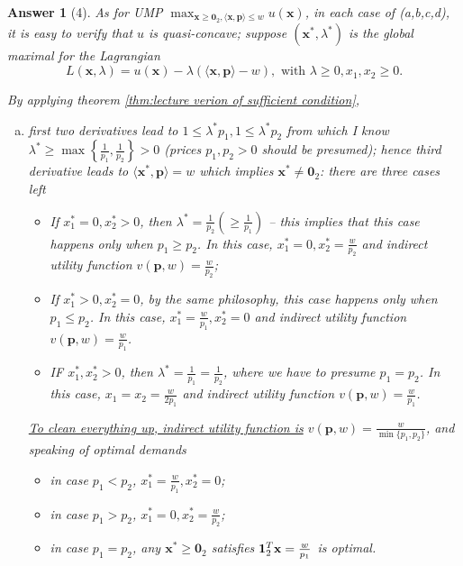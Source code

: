 \documentclass{article}
\newtheorem*{ans}{Answer}
\newcommand{\1}{{\bf 1}}
\newcommand{\0}{{\mathbf{0}}}
\newcommand{\p}{{\mathbf{p}}}
\newcommand{\x}{{\mathbf{x}}}
\newcommand{\<}{\langle}
\renewcommand{\>}{\rangle}
\newcommand{\dps}{\displaystyle}
\begin{document}
\begin{ans}[4]  As for UMP $\dps \max_{\x \ge \0_2, \langle \x,\p\rangle \le w } u(\x)$, in each case of (a,b,c,d), it is easy to verify that $u$ is quasi-concave; suppose $(\x^*,\lambda^*)$ is the global maximal for the Lagrangian 
	$$L(\x,\lambda) = u(\x)  - 	 \lambda(  \langle \x , \p 	\rangle - w ), \text{ with }\lambda \ge 0, x_1,x_2 \ge 0.$$ 
	
	By applying theorem \ref{thm:lecture verion of sufficient condition},
	\begin{enumerate}[(a)]
		\item  first two derivatives lead to $1 \le \lambda^* p_1, 1 \le \lambda^* p_2$ from which I know $\lambda^* \ge \max\left\{ \frac1{p_1},  \frac1{p_2} \right\} >0$ (prices $p_1,p_2 >0$ should be presumed); hence third derivative leads to $\langle \x^* , \p 	\rangle = w  $ which implies $\x^* \ne \0_2$: there are three cases left
		\begin{itemize}
			\item If $x_1^* =0, x_2^* >0$, then $ \lambda^*  = \frac1{p_2} \left(\ge \frac1{p_1}\right)$ -- this implies that this case happens only when $p_1 \ge p_2$. In this case, $x_1^* = 0,x_2^* = \frac{w}{p_2}$ and indirect utility function $v(\p,w) = \frac{w}{p_2}$;
			\item If $x_1^* >0, x_2^* =0$, by the same philosophy, this case happens only when $p_1 \le p_2$. In this case, $x_1^* =  \frac{w}{p_1},x_2^* =0$ and indirect utility function $v(\p,w) = \frac{w}{p_1}$.
			\item IF $x_1^*,x_2^* >0$, then $ \lambda^*  = \frac1{p_1} = \frac1{p_2}$, where we have to presume $p_1=p_2$. In this case, $x_1 = x_2 = \frac{w}{2p_1}$ and indirect utility function $v(\p,w) = \frac{w}{p_1}$.
		\end{itemize}
	
	 \ul{To clean everything up, indirect utility function is} $v(\p,w) = \frac{w}{\min \{p_1, p_2\}}$, and speaking of optimal demands
	\begin{itemize}
		\item in case $p_1 <p_2$, $x_1^* = \frac{w}{p_1}, x_2^*=0$;
				\item in case $p_1 >p_2$, $x_1^* =0  , x_2^*=\frac{w}{p_2}$;
				\item in case $p_1=p_2$,  any $\x^* \ge \0_2$ satisfies $\1_2^T\x=\frac{w}{p_1}$ is optimal.
		\end{itemize}
	

\end{enumerate}
\end{ans}
\end{document}
